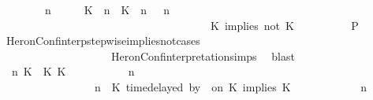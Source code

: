\begin{isabellebody}
\ \ \ \ \ \ \ {\isacartoucheopen}{\isacharparenleft}{\isasymGamma}\ n\ {\isasymturnstile}\ {\isasymPsi}\ {\isasymtriangleright}\ {\isasymPhi}\ {\isacharequal}\ {\isacharparenleft}{\isacharparenleft}{\isacharparenleft}K\ {\isasymUp}\ n{\isacharparenright}\ {\isacharhash}\ {\isacharparenleft}K\ {\isasymnot}{\isasymUp}\ n{\isacharparenright}\ {\isacharhash}\ {\isasymGamma}{\isacharparenright}{\isacharcomma}\ n\isanewline
\ \ \ \ \ \ \ \ \ \ \ \ \ \ \ \ \ \ \ \ \ \ \ \ \ \ \ \ \ \ \ \ \ \ \ {\isasymturnstile}\ {\isasymPsi}\ {\isasymtriangleright}\ {\isacharparenleft}{\isacharparenleft}K\ implies\ not\ K\ {\isacharhash}\ {\isasymPhi}{\isacharparenright}{\isacharparenright}{\isacartoucheclose}\isanewline
\ \ \ \ \ \ \isamarkupfalse%
\ {\isacharquery}P\ \isamarkupfalse%
\ HeronConf{\isacharunderscore}interp{\isacharunderscore}stepwise{\isacharunderscore}implies{\isacharunderscore}not{\isacharunderscore}cases\isanewline
\ \ \ \ \ \ \ \ \ \ \ \ \ \ \ \ \ \ \ \ HeronConf{\isacharunderscore}interpretation{\isachardot}simps\ \isamarkupfalse%
\ blast\isanewline
\ \ \ \ \isamarkupfalse%
\isanewline
\ \ \ \ \ \ \isamarkupfalse%
\ {\isasymGamma}\ n\ K\ {\isasymdelta}{\isasymtau}\ K\ K\ {\isasymPsi}\ {\isasymPhi}\isanewline
\ \ \ \ \ \ \isamarkupfalse%
\ {\isacartoucheopen}{\isacharparenleft}{\isasymGamma}\ n\ {\isasymturnstile}\ {\isasymPsi}\ {\isasymtriangleright}\ {\isasymPhi}\ {\isacharequal}\isanewline
\ \ \ \ \ \ \ \ \ \ \ \ \ \ \ \ {\isacharparenleft}{\isasymGamma}{\isacharcomma}\ n\ {\isasymturnstile}\ {\isacharparenleft}{\isacharparenleft}K\ time{\isacharminus}delayed\ by\ {\isasymdelta}{\isasymtau}\ on\ K\ implies\ K\ {\isacharhash}\ {\isasymPsi}{\isacharparenright}\ {\isasymtriangleright}\ {\isasymPhi}{\isacharparenright}{\isacartoucheclose}\isanewline
\ \ \ \ \ \ \ {\isacartoucheopen}{\isacharparenleft}{\isasymGamma}\ n\ {\isasymturnstile}\ {\isasymPsi}\ {\isasymtriangleright}\ {\isasymPhi}\ {\isacharequal}\isanewline

\end{isabellebody}
